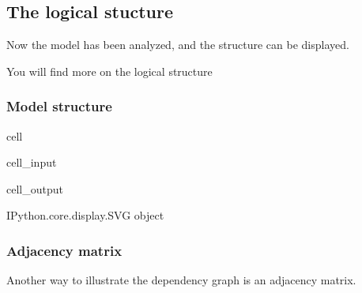 \documentclass[letterpaper,10pt,english]{jupyterBook}
\begin{document}
\subsection{The logical stucture}
\label{\detokenize{content/notebooks/intro/Example Solow:the-logical-stucture}}
\sphinxAtStartPar
Now the model has been analyzed, and the structure can be displayed.

\sphinxAtStartPar
You will find more on the logical structure {\hyperref[\detokenize{content/howto/structure/Logical_structure::doc}]{}}


\subsubsection{Model structure}
\label{\detokenize{content/notebooks/intro/Example Solow:model-structure}}
\begin{sphinxuseclass}{cell}\begin{sphinxVerbatimInput}

\begin{sphinxuseclass}{cell_input}
\begin{sphinxVerbatim}[commandchars=\\\{\}]
  
\end{sphinxVerbatim}

\end{sphinxuseclass}\end{sphinxVerbatimInput}
\begin{sphinxVerbatimOutput}

\begin{sphinxuseclass}{cell_output}
\begin{sphinxVerbatim}[commandchars=\\\{\}]
\PYGZlt{}IPython.core.display.SVG object\PYGZgt{}
\end{sphinxVerbatim}

\end{sphinxuseclass}\end{sphinxVerbatimOutput}

\end{sphinxuseclass}

\subsubsection{Adjacency matrix}
\label{\detokenize{content/notebooks/intro/Example Solow:adjacency-matrix}}
\sphinxAtStartPar
Another way to illustrate the dependency graph is an adjacency matrix.
\end{document}
